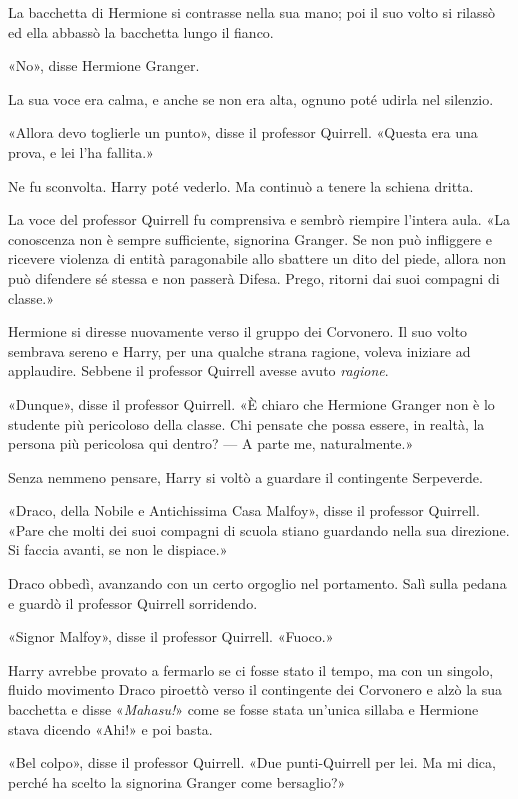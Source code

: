 La bacchetta di Hermione si contrasse nella sua mano; poi il suo volto si rilassò ed ella abbassò la bacchetta lungo il fianco.

«No», disse Hermione Granger.

La sua voce era calma, e anche se non era alta, ognuno poté udirla nel silenzio.

«Allora devo toglierle un punto», disse il professor Quirrell. «Questa era una prova, e lei l’ha fallita.»

Ne fu sconvolta. Harry poté vederlo. Ma continuò a tenere la schiena dritta.

La voce del professor Quirrell fu comprensiva e sembrò riempire l’intera aula. «La conoscenza non è sempre sufficiente, signorina Granger. Se non può infliggere e ricevere violenza di entità paragonabile allo sbattere un dito del piede, allora non può difendere sé stessa e non passerà Difesa. Prego, ritorni dai suoi compagni di classe.»

Hermione si diresse nuovamente verso il gruppo dei Corvonero. Il suo volto sembrava sereno e Harry, per una qualche strana ragione, voleva iniziare ad applaudire. Sebbene il professor Quirrell avesse avuto \textit{ragione}.

«Dunque», disse il professor Quirrell. «È chiaro che Hermione Granger non è lo studente più pericoloso della classe. Chi pensate che possa essere, in realtà, la persona più pericolosa qui dentro? — A parte me, naturalmente.»

Senza nemmeno pensare, Harry si voltò a guardare il contingente Serpeverde.

«Draco, della Nobile e Antichissima Casa Malfoy», disse il professor Quirrell. «Pare che molti dei suoi compagni di scuola stiano guardando nella sua direzione. Si faccia avanti, se non le dispiace.»

Draco obbedì, avanzando con un certo orgoglio nel portamento. Salì sulla pedana e guardò il professor Quirrell sorridendo.

«Signor Malfoy», disse il professor Quirrell. «Fuoco.»

Harry avrebbe provato a fermarlo se ci fosse stato il tempo, ma con un singolo, fluido movimento Draco piroettò verso il contingente dei Corvonero e alzò la sua bacchetta e disse «\textit{Mahasu!}» come se fosse stata un’unica sillaba e Hermione stava dicendo «Ahi!» e poi basta.

«Bel colpo», disse il professor Quirrell. «Due punti-Quirrell per lei. Ma mi dica, perché ha scelto la signorina Granger come bersaglio?»

